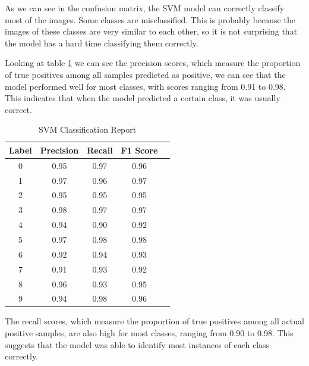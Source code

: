 \documentclass[conference]{IEEEtran}
\begin{document}
As we can see in the confusion matrix, the SVM model can correctly classify most of the images. 
Some classes are misclassified. This is probably because the images of these classes are very similar to each other, so it is not surprising that the model has a hard time classifying them correctly.

Looking at table \ref{tab:svm_classification_report} we can see the precision scores, which measure the proportion of true positives among all samples predicted as positive, we can see that the model performed well for most classes, with scores ranging from 0.91 to 0.98. This indicates that when the model predicted a certain class, it was usually correct.
\begin{table}[!h]
    \centering
    \begin{tabular}{|c|c|c|c|r|}
        \hline
        \textbf{Label} & \textbf{Precision} & \textbf{Recall} &  \textbf{F1 Score} \\ \hline
        0              & 0.95               & 0.97            & 0.96               \\ \hline
        1              & 0.97               & 0.96            & 0.97               \\ \hline
        2              & 0.95               & 0.95            & 0.95               \\ \hline
        3              & 0.98               & 0.97            & 0.97               \\ \hline
        4              & 0.94               & 0.90            & 0.92               \\ \hline
        5              & 0.97               & 0.98            & 0.98               \\ \hline
        6              & 0.92               & 0.94            & 0.93               \\ \hline
        7              & 0.91               & 0.93            & 0.92               \\ \hline
        8              & 0.96               & 0.93            & 0.95               \\ \hline
        9              & 0.94               & 0.98            & 0.96               \\ \hline
    \end{tabular}
    \caption{SVM Classification Report \label{tab:svm_classification_report}}
\end{table}

The recall scores, which measure the proportion of true positives among all actual positive samples, are also high for most classes, ranging from 0.90 to 0.98. This suggests that the model was able to identify most instances of each class correctly.
\end{document}
